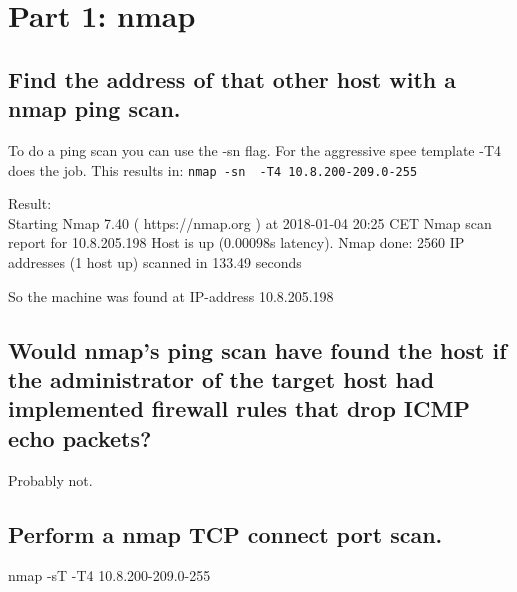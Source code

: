 \section{Part 1: nmap}


\subsection{Find the address of that other host with a nmap ping scan.}

To do a ping scan you can use the -sn flag. For the aggressive spee template -T4 does the job. This results in: \verb|nmap -sn  -T4 10.8.200-209.0-255|

Result:\\
Starting Nmap 7.40 ( https://nmap.org ) at 2018-01-04 20:25 CET
Nmap scan report for 10.8.205.198
Host is up (0.00098s latency).
Nmap done: 2560 IP addresses (1 host up) scanned in 133.49 seconds

So the machine was found at IP-address 10.8.205.198

\subsection{Would nmap’s ping scan have found the host if the administrator of the target host had implemented firewall rules that drop ICMP echo packets?}

Probably not.


\subsection{Perform a nmap TCP connect port scan.}

nmap -sT -T4 10.8.200-209.0-255

